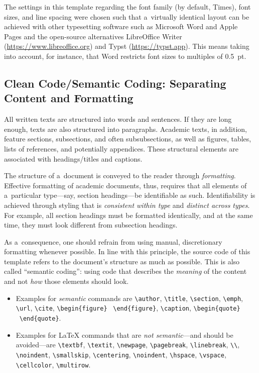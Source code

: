 The settings in this template regarding the font family (by default, Times), font sizes, and line spacing were chosen such that a~virtually identical layout can be achieved with other typesetting software such as Microsoft Word and Apple Pages and the open-source alternatives Libre\-Office Writer (\url{https://www.libreoffice.org}) and Typst (\url{https://typst.app}). This means taking into account, for instance, that Word restricts font sizes to multiples of 0.5~pt.

\subsection{Clean Code/Semantic Coding: Separating Content and Formatting}

All written texts are structured into words and sentences. If they are long enough, texts are also structured into paragraphs. Academic texts, in addition, feature sections, subsections, and often subsubsections, as well as figures, tables, lists of references, and potentially appendices. These structural elements are associated with headings\slash titles and captions.

\pagebreak[1]

The structure of a~document is conveyed to the reader through \emph{formatting}. Effective formatting of academic documents, thus, requires that all elements of a~particular type---say, section headings---be identifiable as such. Identifiability is achieved through styling that is \emph{consistent within type} and \emph{distinct across types}. For example, all section headings must be formatted identically, and at the same time, they must look different from subsection headings.

As a~consequence, one should refrain from using manual, discretionary formatting whenever possible. In line with this principle, the source code of this template refers to the document's structure as much as possible. This is also called ``semantic coding'': using code that describes the \emph{meaning} of the content and not \emph{how} those elements should look.
\begin{itemize}
	\item Examples for \emph{semantic} commands are \verb|\author|, \verb|\title|, \verb|\section|,  \verb|\emph|, \verb|\url|, \verb|\cite|, \verb|\begin{figure}| \textellipsis\ \verb|\end{figure}|, \verb|\caption|, \verb|\begin{quote}| \textellipsis\ \verb|\end{quote}|.
	\item Examples for LaTeX commands that are \emph{not semantic}---and should be avoided---are \verb|\textbf|, \verb|\textit|, \verb|\newpage|, \verb|\pagebreak|, \verb|\linebreak|, \verb|\\|, \verb|\noindent|, \verb|\smallskip|, \verb|\centering|, \verb|\noindent|, \verb|\hspace|, \verb|\vspace|, \verb|\cellcolor|, \verb|\multirow|.
\end{itemize}

